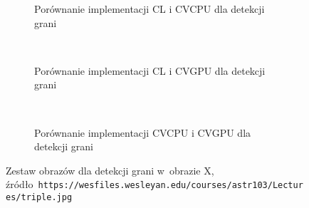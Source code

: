 \begin{itemize}
\begin{figure}[H]
\begin{subfigure}[t]{0.3\textwidth}
	\centering
	\setlength\fboxsep{0pt}
	\setlength\fboxrule{0.5pt}
	\caption{Porównanie implementacji CL i CVCPU dla detekcji grani}
	\label{fig:valRidge4CLCVCPU}
\end{subfigure}
~
\begin{subfigure}[t]{0.3\textwidth}
	\centering
	\setlength\fboxsep{0pt}
	\setlength\fboxrule{0.5pt}
	\caption{Porównanie implementacji CL i CVGPU dla detekcji grani}
	\label{fig:valRidge4CLCVGPU}
\end{subfigure}
~
\begin{subfigure}[t]{0.3\textwidth}
	\centering
	\setlength\fboxsep{0pt}
	\setlength\fboxrule{0.5pt}
	\caption{Porównanie implementacji CVCPU i CVGPU dla detekcji grani}
	\label{fig:valRidge4CVCPUCVGPU}                 
\end{subfigure}
\caption{Zestaw obrazów dla detekcji grani w~obrazie X, \tiny{źródło~\texttt{https://wesfiles.wesleyan.edu/courses/astr103/Lectures/triple.jpg}}}

\label{fig:valRidge4}
\end{figure}

\end{itemize}